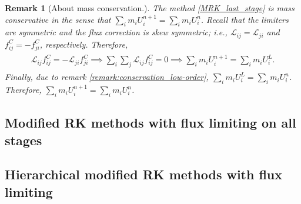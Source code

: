 \documentclass{article}
\newtheorem{remark}{Remark}
\numberwithin{remark}{subsection}
\begin{document}
\begin{remark}[About mass conservation.]
  The method \eqref{MRK_last_stage} is mass conservative in the sense that
  $\sum_i m_iU_i^{n+1}=\sum_i m_iU_i^n$.
  Recall that the limiters are symmetric and the flux correction is skew symmetric; i.e.,
  $\mathcal{L}_{ij}=\mathcal{L}_{ji}$ and $f_{ij}^C=-f_{ji}^C$, respectively.
  Therefore,
  \begin{align*}
    \begin{split}
    \mathcal{L}_{ij}f_{ij}^C=-\mathcal{L}_{ji}f_{ji}^C
    \implies \sum_i\sum_j \mathcal{L}_{ij}f_{ij}^C=0 
    \implies \sum_i m_iU_i^{n+1}=\sum_i m_iU_i^L.
    \end{split}
  \end{align*}
  Finally, due to remark \ref{remark:conservation_low-order}, $\sum_i m_iU_i^L=\sum_i m_iU_i^n$.
  Therefore, $\sum_i m_iU_i^{n+1}=\sum_i m_iU_i^n$.  
\end{remark}

\subsection{Modified RK methods with flux limiting on all stages}
\subsection{Hierarchical modified RK methods with flux limiting}



%

\end{document}
